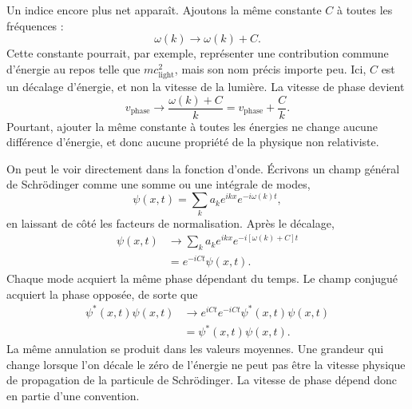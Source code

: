 Un indice encore plus net apparaît. Ajoutons la même constante \(C\) à toutes les fréquences :
\begin{equation}
\omega(k)\longrightarrow \omega(k)+C.
\end{equation}
Cette constante pourrait, par exemple, représenter une contribution commune d’énergie au repos telle que \(mc_{\mathrm{light}}^2\), mais son nom précis importe peu. Ici, \(C\) est un décalage d’énergie, et non la vitesse de la lumière. La vitesse de phase devient
\begin{equation}
v_{\mathrm{phase}}\longrightarrow
\frac{\omega(k)+C}{k}
=v_{\mathrm{phase}}+\frac{C}{k}.
\end{equation}
Pourtant, ajouter la même constante à toutes les énergies ne change aucune différence d’énergie, et donc aucune propriété de la physique non relativiste.

On peut le voir directement dans la fonction d’onde. Écrivons un champ général de Schr\"odinger comme une somme ou une intégrale de modes,
\begin{equation}
\psi(x,t)=\sum_k a_k e^{ikx}e^{-i\omega(k)t},
\end{equation}
en laissant de côté les facteurs de normalisation. Après le décalage,
\begin{align}
\psi(x,t)
&\longrightarrow
\sum_k a_k e^{ikx}e^{-i[\omega(k)+C]t}
\\
&=e^{-iCt}\psi(x,t).
\end{align}
Chaque mode acquiert la même phase dépendant du temps. Le champ conjugué acquiert la phase opposée, de sorte que
\begin{equation}
\begin{aligned}
\psi^*(x,t)\psi(x,t)
&\longrightarrow
e^{iCt}e^{-iCt}\psi^*(x,t)\psi(x,t)
\\
&=\psi^*(x,t)\psi(x,t).
\end{aligned}
\end{equation}
La même annulation se produit dans les valeurs moyennes. Une grandeur qui change lorsque l’on décale le zéro de l’énergie ne peut pas être la vitesse physique de propagation de la particule de Schr\"odinger. La vitesse de phase dépend donc en partie d’une convention.

